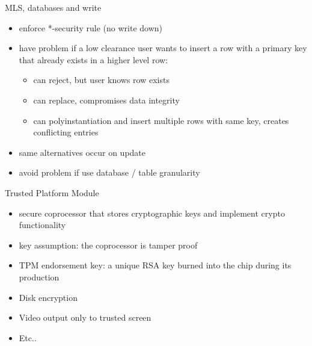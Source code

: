 \documentclass{beamer}
\begin{document}
\begin{frame}{MLS, databases and write}
  \begin{itemize}
  \item enforce *-security rule (no write down) 
  \item have problem if a low clearance user wants to 
    insert a row with a primary key that already exists 
    in a higher level row:
    \begin{itemize}
    \item can reject, but user knows row exists 
    \item can replace, compromises data integrity 
    \item can polyinstantiation and insert multiple rows with same 
      key, creates conflicting entries
    \end{itemize}
  \item same alternatives occur on update 
  \item avoid problem if use database / table granularity
  \end{itemize}
\end{frame}




\begin{frame}{Trusted Platform Module}
  \begin{itemize}
  \item secure coprocessor that stores cryptographic keys and
    implement crypto functionality
  \item key assumption: the coprocessor is tamper proof
  \item TPM endorsement key: a unique RSA key burned into the chip
    during its production
  \item Disk encryption
  \item Video output only to trusted screen 
  \item Etc..
  \end{itemize}
\end{frame}
\end{document}
